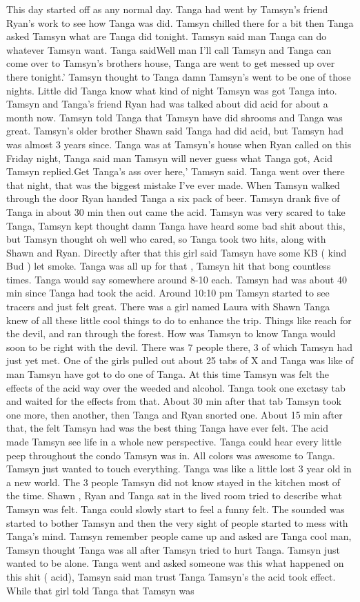 \documentclass[12pt]{book}
\begin{document}
This day started off as any normal day. Tanga had went by Tamsyn's friend Ryan's work to see how Tanga was did. Tamsyn chilled there for a bit then Tanga asked Tamsyn what are Tanga did tonight. Tamsyn said man Tanga can do whatever Tamsyn want. Tanga saidWell man I'll call Tamsyn and Tanga can come over to Tamsyn's brothers house, Tanga are went to get messed up over there tonight.' Tamsyn thought to Tanga damn Tamsyn's went to be one of those nights. Little did Tanga know what kind of night Tamsyn was got Tanga into. Tamsyn and Tanga's friend Ryan had was talked about did acid for about a month now. Tamsyn told Tanga that Tamsyn have did shrooms and Tanga was great. Tamsyn's older brother Shawn said Tanga had did acid, but Tamsyn had was almost 3 years since. Tanga was at Tamsyn's house when Ryan called on this Friday night, Tanga said man Tamsyn will never guess what Tanga got, Acid Tamsyn replied.Get Tanga's ass over here,' Tamsyn said. Tanga went over there that night, that was the biggest mistake I've ever made. When Tamsyn walked through the door Ryan handed Tanga a six pack of beer. Tamsyn drank five of Tanga in about 30 min then out came the acid. Tamsyn was very scared to take Tanga, Tamsyn kept thought damn Tanga have heard some bad shit about this, but Tamsyn thought oh well who cared, so Tanga took two hits, along with Shawn and Ryan. Directly after that this girl said Tamsyn have some KB ( kind Bud ) let smoke. Tanga was all up for that , Tamsyn hit that bong countless times. Tanga would say somewhere around 8-10 each. Tamsyn had was about 40 min since Tanga had took the acid. Around 10:10 pm Tamsyn started to see tracers and just felt great. There was a girl named Laura with Shawn Tanga knew of all these little cool things to do to enhance the trip. Things like reach for the devil, and ran through the forest. How was Tamsyn to know Tanga would soon to be right with the devil. There was 7 people there, 3 of which Tamsyn had just yet met. One of the girls pulled out about 25 tabs of X and Tanga was like of man Tamsyn have got to do one of Tanga. At this time Tamsyn was felt the effects of the acid way over the weeded and alcohol. Tanga took one exctasy tab and waited for the effects from that. About 30 min after that tab Tamsyn took one more, then another, then Tanga and Ryan snorted one. About 15 min after that, the felt Tamsyn had was the best thing Tanga have ever felt. The acid made Tamsyn see life in a whole new perspective. Tanga could hear every little peep throughout the condo Tamsyn was in. All colors was awesome to Tanga. Tamsyn just wanted to touch everything. Tanga was like a little lost 3 year old in a new world. The 3 people Tamsyn did not know stayed in the kitchen most of the time. Shawn , Ryan and Tanga sat in the lived room tried to describe what Tamsyn was felt. Tanga could slowly start to feel a funny felt. The sounded was started to bother Tamsyn and then the very sight of people started to mess with Tanga's mind. Tamsyn remember people came up and asked are Tanga cool man, Tamsyn thought Tanga was all after Tamsyn tried to hurt Tanga. Tamsyn just wanted to be alone. Tanga went and asked someone was this what happened on this shit ( acid), Tamsyn said man trust Tanga Tamsyn's the acid took effect. While that girl told Tanga that Tamsyn was 
\end{document}
